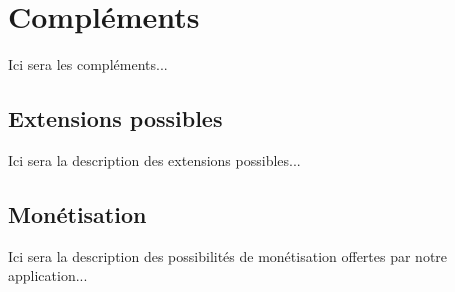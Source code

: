 \section{Compléments}
Ici sera les compléments...
\subsection{Extensions possibles}
Ici sera la description des extensions possibles...
\subsection{Monétisation}
Ici sera la description des possibilités de monétisation offertes par notre application...

